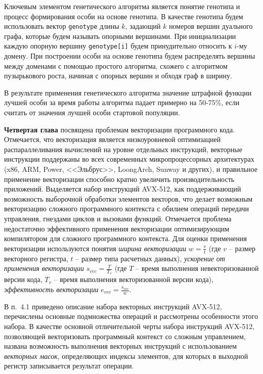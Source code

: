 \documentclass[a4paper,14pt]{extarticle}                     %
\theoremstyle{plain}                                         %
\begin{document}
Ключевым элементом генетического алгоритма является понятие генотипа и процесс формирования особи на основе генотипа.
В качестве генотипа будем использовать вектор \texttt{genotype} длины $k$, задающий $k$ номеров вершин дуального графа, которые будем называть опорными вершинами.
При инициализации каждую опорную вершину \texttt{genotype[i]} будем принудительно относить к $i$-му домену.
При построении особи на основе генотипа будем распределять вершины между доменами с помощью простого алгоритма, схожего с алгоритмом пузырькового роста, начиная с опорных вершин и обходя граф в ширину.

В результате применения генетического алгоритма значение штрафной функции лучшей особи за время работы алгоритма падает примерно на 50-75\%, если считать от значения лучшей особи стартовой популяции.




\textbf{Четвертая глава} посвящена проблемам векторизации программного кода.
Отмечается, что векторизация является низкоуровневой оптимизацией распараллеливания вычислений на уровне отдельных инструкций, векторные инструкции поддержаны во всех современных микропроцессорных архитектурах (x86, ARM, Power, <<Эльбрус>>, LoongArch, Sunway и других), и правильное применение векторизации способно кратно увеличить производительность приложений.
Выделяется набор инструкций AVX-512, как поддерживающий возможность выборочной обработки элементов векторов, что делает возможным векторизацию сложного программного контекста с обилием операций передачи управления, гнездами циклов и вызовами функций.
Отмечается проблема недостаточно эффективного применения векторизации оптимизирующим компилятором для сложного программного контекста.
Для оценки применения векторизации используются понятия \textit{ширина векторизации} $w = \frac{v}{t}$ (где $v$ -- размер векторного регистра, $t$ -- размер типа расчетных данных), \textit{ускорение от применения векторизации} $s_{vec} = \frac{T}{T_v}$ (где $T$ -- время выполнения невекторизованной версии кода, $T_v$ -- время выполнения векторизованной версии кода), \textit{эффективность векторизации} $e_{vec} = \frac{s_{vec}}{w}$.


В п.~4.1 приведено описание набора векторных инструкций AVX-512, перечислены основные подмножества операций и рассмотрены особенности этого набора.
В качестве основной отличительной черты набора инструкций AVX-512, позволяющей векторизовать программный контекст со сложным управлением, названа возможность выполнения векторных инструкций с использованием \textit{векторных масок}, определяющих индексы элементов, для которых в выходной регистр записывается результат операции.
\end{document}
